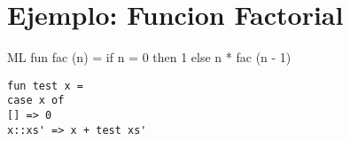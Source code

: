\documentclass[11pt]{article} %
\begin{document}
\section{\color{red}Ejemplo: Funcion Factorial}

ML
fun fac (n) =
if n = 0 then 1
else n * fac (n - 1)


\lstset{language=ML}          %

\begin{lstlisting}[frame=single]  % Start your code-block
fun test x =
case x of
[] => 0
x::xs' => x + test xs'
\end{lstlisting}
\end{document}

